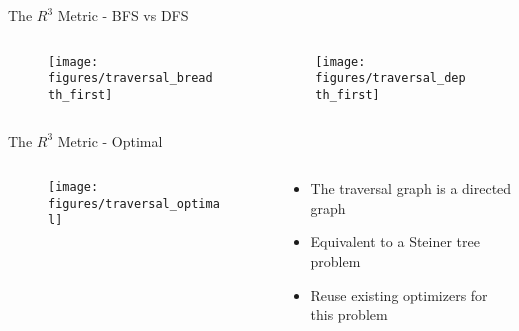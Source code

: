 \begin{frame}{The $ R^{3} $ Metric - BFS vs DFS}
    \begin{columns}[T] %
        \begin{column}{.48\textwidth}

       \begin{figure}
            \centering
            \texttt{[image: figures/traversal\_breadth\_first]}
        \end{figure}

        \end{column}%
        \hfill%
        \begin{column}{.48\textwidth}
            \begin{figure}
                \centering
                \texttt{[image: figures/traversal\_depth\_first]}
            \end{figure}    
        \end{column}%
    \end{columns}
\end{frame}


\begin{frame}{The $ R^{3} $ Metric - Optimal}
    \begin{columns}[T] %
        \begin{column}{.48\textwidth}

       \begin{figure}
            \centering
            \texttt{[image: figures/traversal\_optimal]}
        \end{figure}

        \end{column}%
        \hfill%
        \begin{column}{.48\textwidth}
            \bigskip
            \begin{itemize}
                \item The traversal graph is a directed graph
                \item Equivalent to a Steiner tree problem
                \item Reuse existing optimizers for this problem
            \end{itemize}
        \end{column}%
    \end{columns}
\end{frame}

